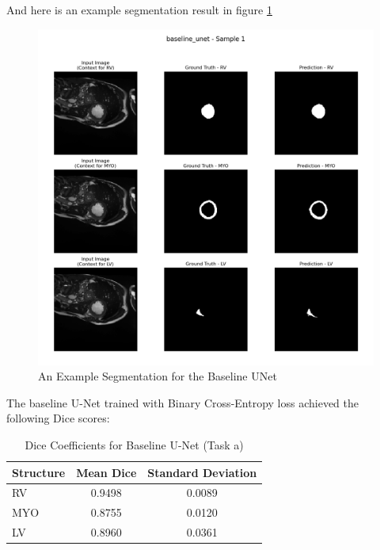 \documentclass{article}
\begin{document}
And here is an example segmentation result in figure \ref{fig:baseline_unet_segmentation_example}
\begin{figure}[H]
  \centering
  \includegraphics[width=\linewidth]{../result/baseline_unet/sample_1_segmentation.png}
  \caption{An Example Segmentation for the Baseline UNet}
  \label{fig:baseline_unet_segmentation_example}
\end{figure}

The baseline U-Net trained with Binary Cross-Entropy loss achieved the following Dice scores:
\begin{table}[H]
\centering
\caption{Dice Coefficients for Baseline U-Net (Task a)}
\label{tab:baseline_unet}
\begin{tabular}{lcc}
\toprule
Structure & Mean Dice & Standard Deviation \\
\midrule
RV        & 0.9498    & 0.0089             \\
MYO       & 0.8755    & 0.0120             \\
LV        & 0.8960    & 0.0361             \\
\bottomrule
\end{tabular}
\end{table}
\end{document}
